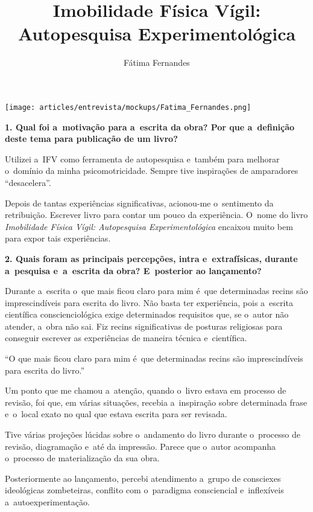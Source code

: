 \documentclass{gescons}
\author{Fátima Fernandes}
\title{Imobilidade Física Vígil: Autopesquisa Experimentológica}
\begin{document}
    \makeentrevistatitle

    \begin{multicols}{2}

\begin{center}
    \texttt{[image: articles/entrevista/mockups/Fatima\_Fernandes.png]}
\end{center}


\textbf{1. Qual foi a~motivação para a~escrita da obra? Por que a~definição deste tema para publicação de um livro?}

Utilizei a~IFV como ferramenta de autopesquisa e~também para melhorar o~domínio da minha psicomotricidade. Sempre tive inspirações de amparadores ``desacelera''.

Depois de tantas experiências significativas, acionou-me o~sentimento da retribuição. Escrever livro para contar um pouco da experiência. O~nome do livro \emph{Imobilidade Física Vígil: Autopesquisa Experimentológica} encaixou muito bem para expor tais experiências.


\textbf{2. Quais foram as principais percepções, intra e~extrafísicas, durante a~pesquisa e~a~escrita da obra? E~posterior ao lançamento?}

Durante a~escrita o~que mais ficou claro para mim é~que determinadas recins são imprescindíveis para escrita do livro. Não basta ter experiência, pois a~escrita científica conscienciológica exige determinados requisitos que, se o~autor não atender, a~obra não sai. Fiz recins significativas de posturas religiosas para conseguir escrever as experiências de maneira técnica e~científica.

\begin{pullquote}
``O  que mais ficou claro para mim é~que determinadas recins são imprescindíveis para escrita do livro.''
\end{pullquote}

Um ponto que me chamou a~atenção, quando o~livro estava em processo de revisão, foi que, em várias situações, recebia a~inspiração sobre determinada frase e~o~local exato no qual que estava escrita para ser revisada.

Tive várias projeções lúcidas sobre o~andamento do livro durante o~processo de revisão, diagramação e~até da impressão. Parece que o~autor acompanha o~processo de materialização da sua obra.

Posteriormente ao lançamento, percebi atendimento a~grupo de consciexes ideológicas zombeteiras, conflito com o~paradigma consciencial e~inflexíveis a~autoexperimentação.


\end{multicols}
\end{document}
